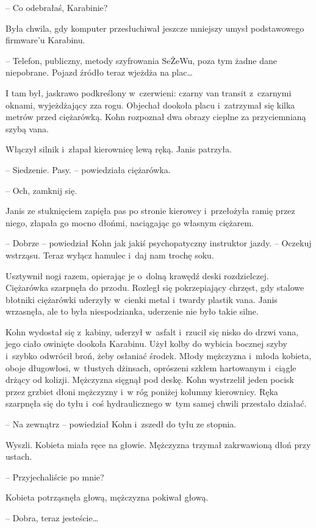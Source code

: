\documentclass[oneside,polish,11pt,sfheadings]{mwbk}
\begin{document}
-- Co odebrałaś, Karabinie?

Była chwila, gdy komputer przesłuchiwał jeszcze mniejszy umysł
podstawowego firmware'u Karabinu.

-- Telefon, publiczny, metody szyfrowania SeŻeWu, poza tym żadne dane
niepobrane. Pojazd źródło teraz wjeżdża na plac\ldots

I tam był, jaskrawo podkreślony w~czerwieni: czarny van transit z~czarnymi oknami, wyjeżdżający zza rogu. Objechał dookoła placu i~zatrzymał się kilka metrów przed ciężarówką. Kohn rozpoznał dwa obrazy
cieplne za przyciemnianą szybą vana.

Włączył silnik i~złapał kierownicę lewą ręką. Janis patrzyła.

-- Siedzenie. Pasy. -- powiedziała ciężarówka.

-- Och, zamknij się.

Janis ze stuknięciem zapięła pas po stronie kierowcy i~przełożyła ramię
przez niego, złapała go mocno dłońmi, naciągając go własnym ciężarem.

-- Dobrze -- powiedział Kohn jak jakiś psychopatyczny instruktor jazdy. -- Oczekuj wstrząsu. Teraz wyłącz hamulec i~daj nam trochę soku.

Usztywnił nogi razem, opierając je o~dolną krawędź deski rozdzielczej.
Ciężarówka szarpnęła do przodu. Rozległ się pokrzepiający chrzęst, gdy
stalowe błotniki ciężarówki uderzyły w~cienki metal i~twardy plastik
vana. Janis wrzasnęła, ale to była niespodzianka, uderzenie nie było
takie silne.

Kohn wydostał się z~kabiny, uderzył w~asfalt i~rzucił się nisko do drzwi
vana, jego ciało owinięte dookoła Karabinu. Użył kolby do wybicia
bocznej szyby i~szybko odwrócił broń, żeby osłaniać środek. Młody
mężczyzna i~młoda kobieta, oboje długowłosi, w~tłustych dżinsach,
oprószeni szkłem hartowanym i~ciągle drżący od kolizji. Mężczyzna
sięgnął pod deskę. Kohn wystrzelił jeden pocisk przez grzbiet dłoni
mężczyzny i~w róg poniżej kolumny kierownicy. Ręka szarpnęła się do
tyłu i~coś hydraulicznego w~tym samej chwili przestało działać.

-- Na zewnątrz -- powiedział Kohn i~zszedł do tyłu ze stopnia.

Wyszli. Kobieta miała ręce na głowie. Mężczyzna trzymał zakrwawioną
dłoń przy ustach.

-- Przyjechaliście po mnie?

Kobieta potrząsnęła głową, mężczyzna pokiwał głową.

-- Dobra, teraz jesteście\ldots
\end{document}

